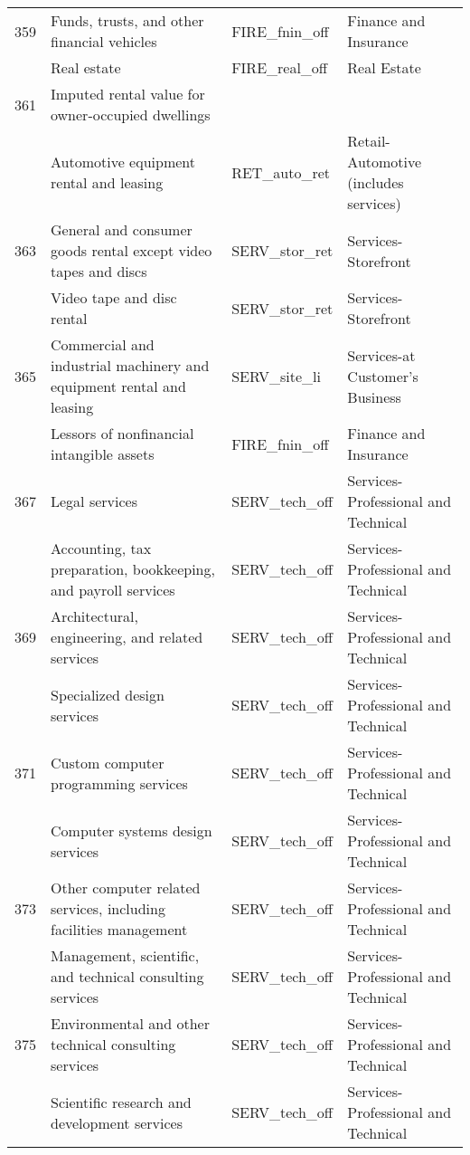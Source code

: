 \begin{landscape}
\begin{small}
\begin{longtable}{clll}
359 & Funds, trusts, and other financial vehicles & FIRE\_fnin\_off & Finance and Insurance \\
\gray 360 & Real estate & FIRE\_real\_off & Real Estate \\
361 & Imputed rental value for owner-occupied dwellings &  &  \\
\gray 362 & Automotive equipment rental and leasing & RET\_auto\_ret & Retail-Automotive (includes services) \\
363 & General and consumer goods rental except video tapes and discs & SERV\_stor\_ret & Services-Storefront \\
\gray 364 & Video tape and disc rental & SERV\_stor\_ret & Services-Storefront \\
365 & Commercial and industrial machinery and equipment rental and leasing & SERV\_site\_li & Services-at Customer's Business \\
\gray 366 & Lessors of nonfinancial intangible assets & FIRE\_fnin\_off & Finance and Insurance \\
367 & Legal services & SERV\_tech\_off & Services-Professional and Technical \\
\gray 368 & Accounting, tax preparation, bookkeeping, and payroll services & SERV\_tech\_off & Services-Professional and Technical \\
369 & Architectural, engineering, and related services & SERV\_tech\_off & Services-Professional and Technical \\
\gray 370 & Specialized design services & SERV\_tech\_off & Services-Professional and Technical \\
371 & Custom computer programming services & SERV\_tech\_off & Services-Professional and Technical \\
\gray 372 & Computer systems design services & SERV\_tech\_off & Services-Professional and Technical \\
373 & Other computer related services, including facilities management & SERV\_tech\_off & Services-Professional and Technical \\
\gray 374 & Management, scientific, and technical consulting services & SERV\_tech\_off & Services-Professional and Technical \\
375 & Environmental and other technical consulting services & SERV\_tech\_off & Services-Professional and Technical \\
\gray 376 & Scientific research and development services & SERV\_tech\_off & Services-Professional and Technical \\

\end{longtable}
\end{small}
\end{landscape}
